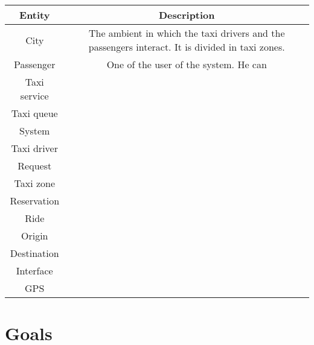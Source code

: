 \begin{center}
\begin{tabular}{|c|c|} \hline
\textbf{Entity} & \textbf{Description} \\ \hline
City & The ambient in which the taxi drivers and the passengers interact.
It is divided in taxi zones. \\ \hline
Passenger & One of the user of the system. He can\\ \hline
Taxi service & \\ \hline
Taxi queue & \\ \hline
System & \\ \hline
Taxi driver & \\ \hline
Request & \\ \hline
Taxi zone & \\ \hline
Reservation & \\ \hline
Ride & \\ \hline
Origin & \\ \hline
Destination & \\ \hline
Interface & \\ \hline
GPS & \\ \hline
\end{tabular}
\end{center}

\section{Goals}